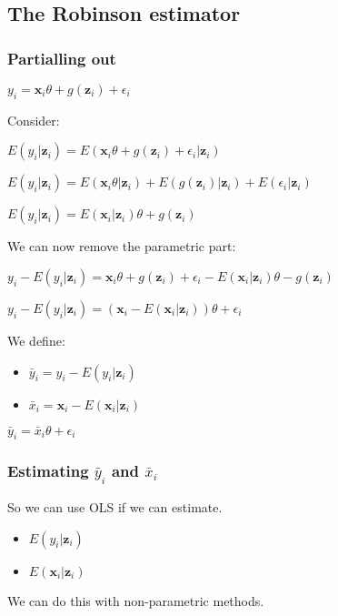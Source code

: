 
\subsection{The Robinson estimator}

\subsubsection{Partialling out}

\(y_i=\mathbf x_i\theta +g(\mathbf z_i) +\epsilon_i\)

Consider:

\(E(y_i|\mathbf z_i)=E(\mathbf x_i\theta +g(\mathbf z_i) + \epsilon_i|\mathbf z_i)\)

\(E(y_i|\mathbf z_i)=E(\mathbf x_i\theta|\mathbf z_i)+E(g(\mathbf z_i)|\mathbf z_i) + E(\epsilon_i|\mathbf z_i)\)

\(E(y_i|\mathbf z_i)=E(\mathbf x_i|\mathbf z_i)\theta+g(\mathbf z_i)\)

We can now remove the parametric part:

\(y_i-E(y_i|\mathbf z_i)=\mathbf x_i\theta +g(\mathbf z_i) + \epsilon_i - E(\mathbf x_i|\mathbf z_i)\theta -g(\mathbf z_i)\)

\(y_i-E(y_i|\mathbf z_i)=(\mathbf x_i- E(\mathbf x_i|\mathbf z_i))\theta +\epsilon_i\)

We define:

\begin{itemize}
\item \(\bar y_i = y_i-E(y_i|\mathbf z_i)\)
\item \(\bar x_i = \mathbf x_i- E(\mathbf x_i|\mathbf z_i)\)
\end{itemize}

\(\bar y_i =\bar x_i \theta +\epsilon_i\)

\subsubsection{Estimating \(\bar y_i\) and \(\bar x_i\)}

So we can use OLS if we can estimate.

\begin{itemize}
\item \(E(y_i|\mathbf z_i)\)
\item \(E(\mathbf x_i|\mathbf z_i)\)
\end{itemize}

We can do this with non-parametric methods.

